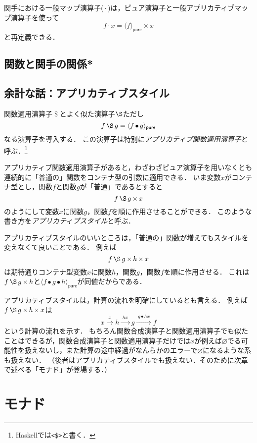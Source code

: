 \documentclass[twocolumn]{jsbook}
\newcommand{\keyword}[1]{{\emph{#1}}}
\newcommand{\code}[1]{\texttt{#1}}
\DeclareMathOperator{\hsklApplicativeApply}{\S}
\DeclareMathOperator{\hsklApplicativeMap}{\times}
\DeclareMathOperator{\hsklFmap}{\cdot}
\newcommand{\hsklNothing}{\varnothing}
\newcommand{\hsklPure}[1]{\langle#1\rangle_\textsf{pure}}
\DeclareMathOperator{\mathApply}{\$}
\DeclareMathOperator{\mathCompose}{\bullet}
\begin{document}
関手における一般マップ演算子($\hsklFmap$)は，ピュア演算子と一般アプリカティブマップ演算子を使って$$f\hsklFmap x=\hsklPure{f}\hsklApplicativeMap x$$と再定義できる．



\section{関数と関手の関係*}

\section{余計な話：アプリカティブスタイル}

関数適用演算子$\mathApply$とよく似た演算子$\hsklApplicativeApply$ただし$$f\hsklApplicativeApply g=\hsklPure{f\mathCompose g}$$なる演算子を導入する．
この演算子は特別に\keyword{アプリカティブ関数適用演算子}と呼ぶ．\footnote{Haskellでは\code{<\$>}と書く．}

アプリカティブ関数適用演算子があると，わざわざピュア演算子を用いなくとも連続的に「普通の」関数をコンテナ型の引数に適用できる．
いま変数$x$がコンテナ型とし，関数$f$と関数$g$が「普通」であるとすると$$f\hsklApplicativeApply g\hsklApplicativeMap x$$のようにして変数$x$に関数$g$，関数$f$を順に作用させることができる．
このような書き方を\keyword{アプリカティブスタイル}と呼ぶ．

アプリカティブスタイルのいいところは，「普通の」関数が増えてもスタイルを変えなくて良いことである．
例えば$$f\hsklApplicativeApply g\hsklApplicativeMap h\hsklApplicativeMap x$$は期待通りコンテナ型変数$x$に関数$h$，関数$g$，関数$f$を順に作用させる．
これは$f\hsklApplicativeApply g\hsklApplicativeMap h$と$\hsklPure{f\mathCompose g\mathCompose h}$が同値だからである．

アプリカティブスタイルは，計算の流れを明確にしているとも言える．
例えば$f\hsklApplicativeApply g\hsklApplicativeMap h\hsklApplicativeMap x$は$$x\xrightarrow{\;x\;}h\xrightarrow{\;hx\;}g\xrightarrow{\;g\mathCompose hx\;}f$$という計算の流れを示す．
もちろん関数合成演算子と関数適用演算子でも似たことはできるが，関数合成演算子と関数適用演算子だけでは$x$が例えば$\hsklNothing$でる可能性を扱えないし，また計算の途中経過がなんらかのエラーで$\hsklNothing$になるような系も扱えない．
（後者はアプリカティブスタイルでも扱えない．そのために次章で述べる「モナド」が登場する．）




\chapter{モナド}
\end{document}
